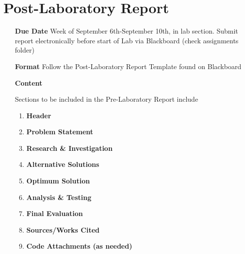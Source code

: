 \documentclass[]{report}
\begin{document}
\begin{itemize}
{	}
\end{itemize}

\section{Post-Laboratory Report}

\begin{itemize}
	\item[\textbf{Due Date}]{Week of September 6th-September 10th, \the\year \space in lab section. Submit report electronically before start of Lab via Blackboard (check assignments folder)}
	\item[\textbf{Format}]{Follow the Post-Laboratory Report Template found on Blackboard}
	\item[\textbf{Content}]{Sections to be included in the Pre-Laboratory Report include
		\begin{enumerate}
			\item \textbf{Header}
			\item \textbf{Problem Statement}
			\item \textbf{Research \& Investigation}
			\item \textbf{Alternative Solutions}
			\item \textbf{Optimum Solution}
			\item \textbf{Analysis \& Testing}
			\item \textbf{Final Evaluation}
			\item \textbf{Sources/Works Cited}
			\item \textbf{Code Attachments (as needed)}
		\end{enumerate}
		
	}
\end{itemize}
\end{document}
